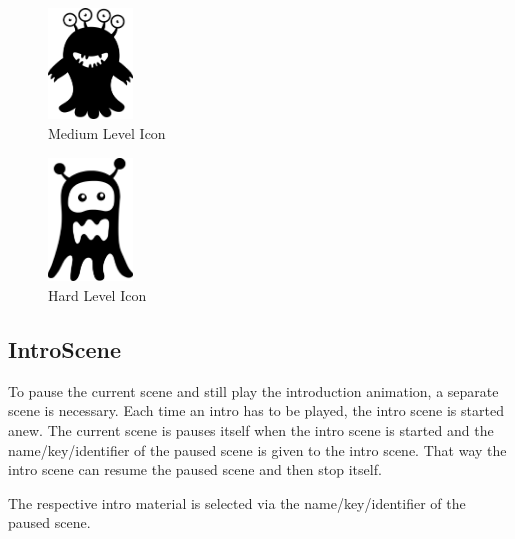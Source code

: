 \begin{figure}[H]
    \centering
    \includegraphics[width=0.2\textwidth]{figures/mediumlevelicon}
    \caption{Medium Level Icon}
    \label{fig:mediumlevelicon}
\end{figure}

\begin{figure}[H]
    \centering
    \includegraphics[width=0.2\textwidth]{figures/hardlevelicon}
    \caption{Hard Level Icon}
    \label{fig:hardlevelicon}
\end{figure}

\subsection{IntroScene}\label{subsec:introscene}
To pause the current scene and still play the introduction animation, a separate scene is necessary.
Each time an intro has to be played, the intro scene is started anew.
The current scene is pauses itself when the intro scene is started and the name/key/identifier
of the paused scene is given to the intro scene.
That way the intro scene can resume the paused scene and then stop itself.

The respective intro material is selected via the name/key/identifier of the paused scene.

